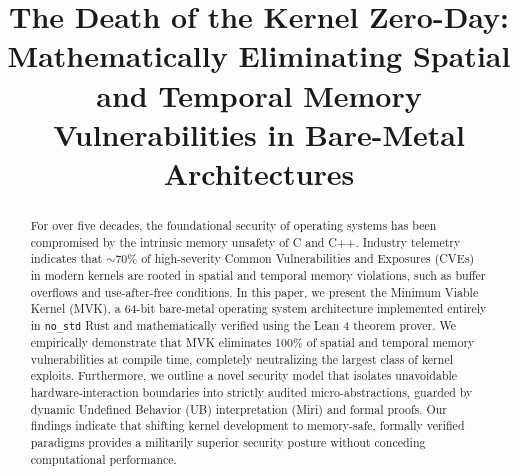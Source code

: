 \documentclass[conference]{IEEEtran}
\begin{document}
\title{The Death of the Kernel Zero-Day: Mathematically Eliminating Spatial and Temporal Memory Vulnerabilities in Bare-Metal Architectures\\
}

\author{
}

\maketitle

\begin{center}
\end{center}
\bigskip


\begin{abstract}
For over five decades, the foundational security of operating systems has been compromised by the intrinsic memory unsafety of C and C++. Industry telemetry indicates that $\sim$70\% of high-severity Common Vulnerabilities and Exposures (CVEs) in modern kernels are rooted in spatial and temporal memory violations, such as buffer overflows and use-after-free conditions. In this paper, we present the Minimum Viable Kernel (MVK), a 64-bit bare-metal operating system architecture implemented entirely in \texttt{no\_std} Rust and mathematically verified using the Lean 4 theorem prover. We empirically demonstrate that MVK eliminates 100\% of spatial and temporal memory vulnerabilities at compile time, completely neutralizing the largest class of kernel exploits. Furthermore, we outline a novel security model that isolates unavoidable hardware-interaction boundaries into strictly audited micro-abstractions, guarded by dynamic Undefined Behavior (UB) interpretation (Miri) and formal proofs. Our findings indicate that shifting kernel development to memory-safe, formally verified paradigms provides a militarily superior security posture without conceding computational performance.
\end{abstract}
\end{document}
